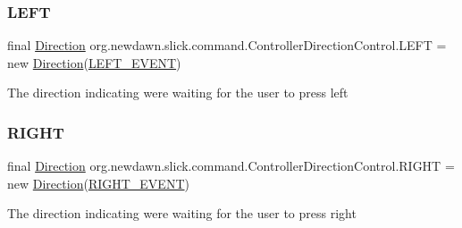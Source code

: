 \subsubsection{\texorpdfstring{L\+E\+FT}{LEFT}}
{\footnotesize\ttfamily final \mbox{\hyperlink{classorg_1_1newdawn_1_1slick_1_1command_1_1_controller_direction_control_1_1_direction}{Direction}} org.\+newdawn.\+slick.\+command.\+Controller\+Direction\+Control.\+L\+E\+FT = new \mbox{\hyperlink{classorg_1_1newdawn_1_1slick_1_1command_1_1_controller_direction_control_1_1_direction}{Direction}}(\mbox{\hyperlink{classorg_1_1newdawn_1_1slick_1_1command_1_1_controller_control_a6ab45f44c82328eec0129ec6449d0fd8}{L\+E\+F\+T\+\_\+\+E\+V\+E\+NT}})\hspace{0.3cm}{\ttfamily [static]}}

The direction indicating we\textquotesingle{}re waiting for the user to press left \mbox{\label{classorg_1_1newdawn_1_1slick_1_1command_1_1_controller_direction_control_a743673106a70b066154c553bc9655133}} 
\subsubsection{\texorpdfstring{R\+I\+G\+HT}{RIGHT}}
{\footnotesize\ttfamily final \mbox{\hyperlink{classorg_1_1newdawn_1_1slick_1_1command_1_1_controller_direction_control_1_1_direction}{Direction}} org.\+newdawn.\+slick.\+command.\+Controller\+Direction\+Control.\+R\+I\+G\+HT = new \mbox{\hyperlink{classorg_1_1newdawn_1_1slick_1_1command_1_1_controller_direction_control_1_1_direction}{Direction}}(\mbox{\hyperlink{classorg_1_1newdawn_1_1slick_1_1command_1_1_controller_control_a62b7d89e02ab3846e5a38dbd5d8da751}{R\+I\+G\+H\+T\+\_\+\+E\+V\+E\+NT}})\hspace{0.3cm}{\ttfamily [static]}}

The direction indicating we\textquotesingle{}re waiting for the user to press right \mbox{\label{classorg_1_1newdawn_1_1slick_1_1command_1_1_controller_direction_control_a0126ad3b966e621d98a56110cd3feaf3}} 
